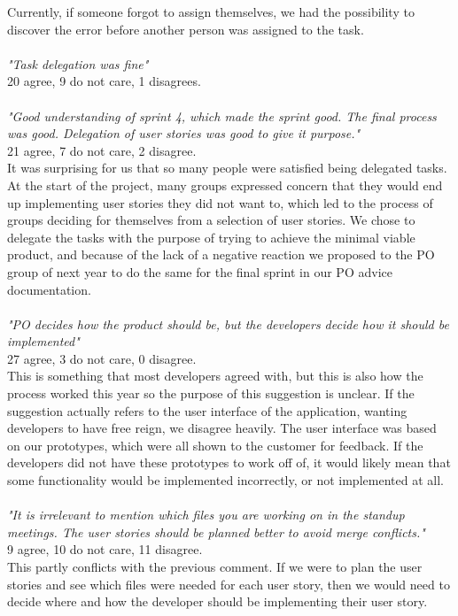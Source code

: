 Currently, if someone forgot to assign themselves, we had the possibility to discover the error before another person was assigned to the task.
\\\\
\textit{"Task delegation was fine"}
\\
20 agree, 9 do not care, 1 disagrees.
\\\\
\textit{"Good understanding of sprint 4, which made the sprint good. The final process was good. Delegation of user stories was good to give it purpose."}
\\
21 agree, 7 do not care, 2 disagree.
\\
It was surprising for us that so many people were satisfied being delegated tasks. 
At the start of the project, many groups expressed concern that they would end up implementing user stories they did not want to, which led to the process of groups deciding for themselves from a selection of user stories.
We chose to delegate the tasks with the purpose of trying to achieve the minimal viable product, and because of the lack of a negative reaction we proposed to the PO group of next year to do the same for the final sprint in our PO advice documentation.
\\\\
\textit{"PO decides how the product should be, but the developers decide how it should be implemented"}
\\
27 agree, 3 do not care, 0 disagree.
\\
This is something that most developers agreed with, but this is also how the process worked this year so the purpose of this suggestion is unclear.
If the suggestion actually refers to the user interface of the application, wanting developers to have free reign, we disagree heavily.
The user interface was based on our prototypes, which were all shown to the customer for feedback. 
If the developers did not have these prototypes to work off of, it would likely mean that some functionality would be implemented incorrectly, or not implemented at all.
\\\\
\textit{"It is irrelevant to mention which files you are working on in the standup meetings. The user stories should be planned better to avoid merge conflicts."}
\\
9 agree, 10 do not care, 11 disagree.
\\
This partly conflicts with the previous comment. 
If we were to plan the user stories and see which files were needed for each user story, then we would need to decide where and how the developer should be implementing their user story. 
